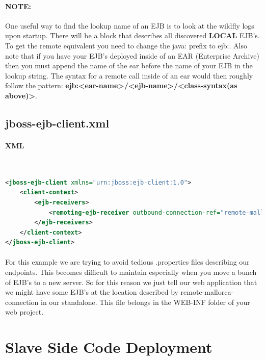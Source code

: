 \documentclass[
10pt, %
letterpaper, %
oneside, %
headinclude,footinclude, %
BCOR5mm, %
]{scrartcl}
\begin{document}
\paragraph{\textbf{NOTE:}} One useful way to find the lookup name of an EJB is to look at the wildfly logs upon startup. There will be a block that describes all discovered \textbf{LOCAL} EJB's. To get the remote equivalent you need to change the java: prefix to ejb:. Also note that if you have your EJB's deployed inside of an EAR (Enterprise Archive) then you must append the name of the ear before the name of your EJB in the lookup string. The syntax for a remote call inside of an ear would then roughly follow the pattern: \textbf{ejb:<ear-name>/<ejb-name>/<class-syntax(as above)>}.


\subsection{jboss-ejb-client.xml}


\paragraph{XML}~
\begin{lstlisting}[language=XML]
<jboss-ejb-client xmlns="urn:jboss:ejb-client:1.0">
	<client-context>
		<ejb-receivers>
			<remoting-ejb-receiver outbound-connection-ref="remote-mallorca-connection"/>
		</ejb-receivers>
	</client-context>
</jboss-ejb-client>
\end{lstlisting}

\paragraph{} For this example we are trying to avoid tedious .properties files describing our endpoints. This becomes difficult to maintain especially when you move a bunch of EJB's to a new server. So for this reason we just tell our web application that we might have some EJB's at the location described by remote-mallorca-connection in our standalone. This file belongs in the WEB-INF folder of your web project.



\section{Slave Side Code Deployment}
\end{document}
